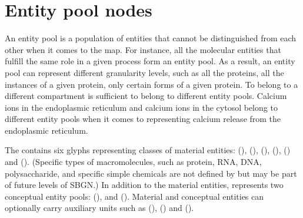 \section{Entity pool nodes}\label{sec:EPNs}

An entity pool is a population of entities that cannot be distinguished from each other when it comes to the \SBGNPDLone map.
For instance, all the molecular  entities that fulfill the same role in a given process form an entity pool.
As a result, an entity pool can represent different granularity levels, such as all the proteins, all the instances of a given protein, only certain forms of a given protein.
To belong to a different compartment is sufficient to belong to different entity pools.
Calcium ions in the endoplasmic reticulum and calcium ions in the cytosol belong to different entity pools when it comes to representing calcium release from the endoplasmic reticulum.

The \PD contains six glyphs representing classes of material entities:  (),  (),  (),  (),  () and  ().
(Specific types of macromolecules, such as protein, RNA, DNA, polysaccharide, and specific simple chemicals are not defined by \PD but may be part of future levels of SBGN.)
In addition to the material entities, \PD represents two conceptual entity pools:  (), and  ().
Material and conceptual entities can optionally carry auxiliary units such as  (),   () and  ().













